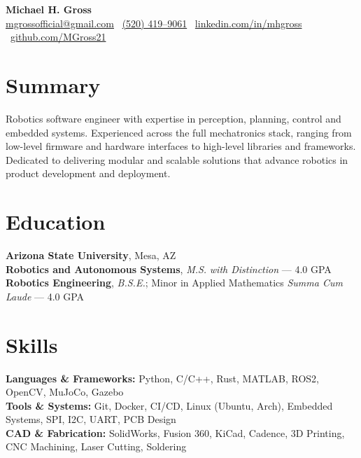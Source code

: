 \documentclass[10pt]{article}
\begin{document}

\begin{center}
    {\LARGE \textbf{Michael H. Gross}} \\
    \href{mailto:mgrossofficial@gmail.com}{mgrossofficial@gmail.com} \textbar\ \href{tel:+15204199061}{(520) 419--9061} \textbar\ 
    \href{https://www.linkedin.com/in/mhgross}{linkedin.com/in/mhgross} \textbar\ \href{https://github.com/MGross21}{github.com/MGross21}
\end{center}

\section*{Summary}
Robotics software engineer with expertise in perception, planning, control and embedded systems. Experienced across the full mechatronics stack, ranging from low-level firmware and hardware interfaces to high-level libraries and frameworks. Dedicated to delivering modular and scalable solutions that advance robotics in product development and deployment.

\section*{Education}
\textbf{Arizona State University}, Mesa, AZ \\
\textbf{Robotics and Autonomous Systems}, \textit{M.S.} \hfill \textit{with Distinction} --- 4.0 GPA \\
\textbf{Robotics Engineering}, \textit{B.S.E.}; Minor in Applied Mathematics \hfill \textit{Summa Cum Laude} --- 4.0 GPA

\section*{Skills}
\textbf{Languages \& Frameworks:} Python, C/C++, Rust, MATLAB, ROS2, OpenCV, MuJoCo, Gazebo \\
\textbf{Tools \& Systems:} Git, Docker, CI/CD, Linux (Ubuntu, Arch), Embedded Systems, SPI, I2C, UART, PCB Design \\
\textbf{CAD \& Fabrication:} SolidWorks, Fusion 360, KiCad, Cadence, 3D Printing, CNC Machining, Laser Cutting, Soldering
\end{document}
